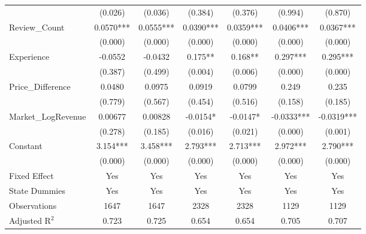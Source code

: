 \begin{table}[]
\begin{threeparttable}[t]
\begin{tabular}{@{}lcccccc@{}}
                             & (0.026)        & (0.036)        & (0.384)        & (0.376)        & (0.994)        & (0.870)        \\
Review\_Count                & 0.0570***      & 0.0555***      & 0.0390***      & 0.0359***      & 0.0406***      & 0.0367***      \\
                             & (0.000)        & (0.000)        & (0.000)        & (0.000)        & (0.000)        & (0.000)        \\
Experience                   & -0.0552        & -0.0432        & 0.175**        & 0.168**        & 0.297***       & 0.295***       \\
                             & (0.387)        & (0.499)        & (0.004)        & (0.006)        & (0.000)        & (0.000)        \\
Price\_Difference            & 0.0480         & 0.0975         & 0.0919         & 0.0799         & 0.249          & 0.235          \\
                             & (0.779)        & (0.567)        & (0.454)        & (0.516)        & (0.158)        & (0.185)        \\
Market\_LogRevenue           & 0.00677        & 0.00828        & -0.0154*       & -0.0147*       & -0.0333***     & -0.0319***     \\
                             & (0.278)        & (0.185)        & (0.016)        & (0.021)        & (0.000)        & (0.001)        \\
Constant                     & 3.154***       & 3.458***       & 2.793***       & 2.713***       & 2.972***       & 2.790***       \\
                             & (0.000)        & (0.000)        & (0.000)        & (0.000)        & (0.000)        & (0.000)        \\
Fixed Effect                 & Yes            & Yes            & Yes            & Yes            & Yes            & Yes            \\
State Dummies                & Yes            & Yes            & Yes            & Yes            & Yes            & Yes            \\
Observations                 & 1647           & 1647           & 2328           & 2328           & 1129           & 1129           \\
Adjusted R$^2$               & 0.723          & 0.725          & 0.654          & 0.654          & 0.705          & 0.707          \\

\end{tabular}
\end{threeparttable}
\end{table}
